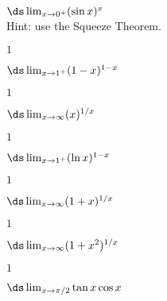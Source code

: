 \begin{multicols}{2}[]
\begin{enumialphparenastyle}
\begin{ex}
\end{ex}

\begin{ex} 
 {$\ds \lim_{x\to 0^+} (\sin x)^{x}$ \\ Hint: use the Squeeze Theorem.}

\begin{sol}
 {$1$} 
\end{sol}

\end{ex}

\begin{ex} 
{$\ds \lim_{x\to 1^+} (1-x)^{1-x}$}
 
\begin{sol}
 {$1$}
\end{sol}

\end{ex}


\begin{ex} 
{$\ds \lim_{x\to \infty} (x)^{1/x}$}

\begin{sol}
 {$1$} 
\end{sol}

\end{ex}

\begin{ex} 
{$\ds \lim_{x\to 1^+} (\ln x)^{1-x}$}
 
\begin{sol}
 {$1$}
\end{sol}

\end{ex}

\begin{ex} 
 {$\ds \lim_{x\to \infty} (1+x)^{1/x}$}
 
\begin{sol}
{$1$} 
\end{sol}

\end{ex}

\begin{ex} 
 {$\ds \lim_{x\to \infty} (1+x^2)^{1/x}$}

\begin{sol}
 {$1$} 
\end{sol}

\end{ex}

\begin{ex} 
 {$\ds \lim_{x\to \pi/2} \tan x\cos x$}


\end{ex}
\end{enumialphparenastyle}
\end{multicols}
